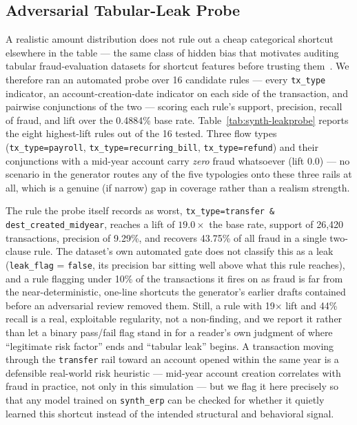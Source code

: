 \subsection{Adversarial Tabular-Leak Probe}
\label{sec:synthetic-leakprobe}

A realistic amount distribution does not rule out a cheap categorical
shortcut elsewhere in the table — the same class of hidden bias that motivates
auditing tabular fraud-evaluation datasets for shortcut features before
trusting them~\cite{jesus2022turning}. We therefore ran an automated probe over 16
candidate rules — every \texttt{tx\_type} indicator, an account-creation-date
indicator on each side of the transaction, and pairwise conjunctions of the
two — scoring each rule's support, precision, recall of fraud, and lift over
the 0.4884\% base rate. Table~\ref{tab:synth-leakprobe} reports the eight
highest-lift rules out of the 16 tested. Three flow types
(\texttt{tx\_type=payroll}, \texttt{tx\_type=recurring\_bill},
\texttt{tx\_type=refund}) and their conjunctions with a mid-year account
carry \emph{zero} fraud whatsoever (lift 0.0) — no scenario in the generator
routes any of the five typologies onto these three rails at all, which is a
genuine (if narrow) gap in coverage rather than a realism strength.

The rule the probe itself records as worst,
\texttt{tx\_type=transfer \& dest\_created\_midyear}, reaches a lift of
$19.0\times$ the base rate, support of 26{,}420 transactions, precision of
9.29\%, and recovers 43.75\% of all fraud in a single two-clause rule. The
dataset's own automated gate does not classify this as a leak
(\texttt{leak\_flag} = \texttt{false}, its precision bar sitting well above
what this rule reaches), and a rule flagging under 10\% of the transactions it
fires on as fraud is far from the near-deterministic, one-line shortcuts the
generator's earlier drafts contained before an adversarial review removed
them. Still, a rule with 19$\times$ lift and 44\% recall is a real,
exploitable regularity, not a non-finding, and we report it rather than let a
binary pass/fail flag stand in for a reader's own judgment of where
``legitimate risk factor'' ends and ``tabular leak'' begins. A transaction
moving through the \texttt{transfer} rail toward an account opened within the
same year is a defensible real-world risk heuristic — mid-year account
creation correlates with fraud in practice, not only in this simulation — but
we flag it here precisely so that any model trained on \texttt{synth\_erp}
can be checked for whether it quietly learned this shortcut instead of the
intended structural and behavioral signal.


